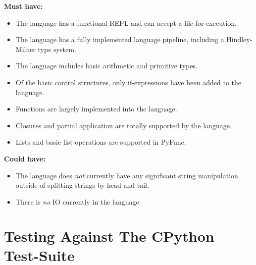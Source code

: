\documentclass{l4proj}
\begin{document}
\textbf{Must have:}
\begin{itemize}
    \item The language has a functional REPL and can accept a file for execution.
    \item The language has a fully implemented language pipeline, including a Hindley-Milner type system.
    \item The language includes basic arithmetic and primitive types.
    \item Of the basic control structures, only if-expressions have been added to the language.
    \item Functions are largely implemented into the language.
    \item Closures and partial application are totally supported by the language.
    \item Lists and basic list operations are supported in PyFunc.
\end{itemize}

\textbf{Could have:}
\begin{itemize}
    \item The language does \emph{not} currently have any significant string manipulation outside of splitting strings by head and tail.
    \item There is \emph{no} IO currently in the language
\end{itemize}


\section{Testing Against The CPython Test-Suite}
\end{document}
